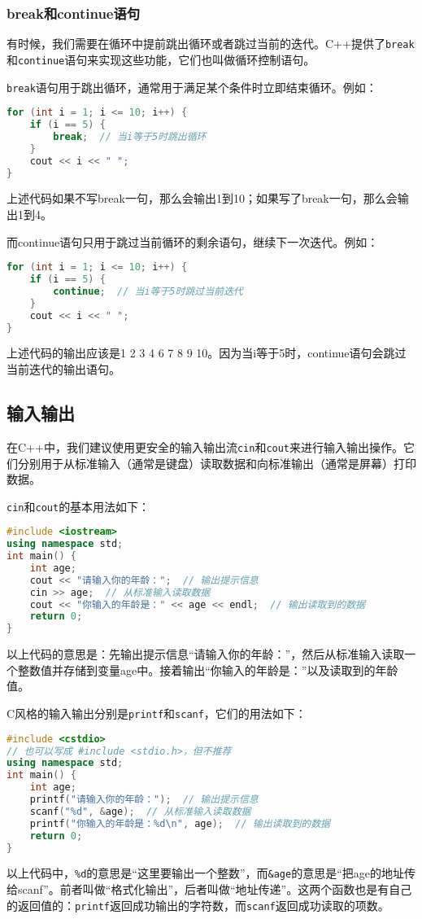 \documentclass[../main.tex]{subfiles}
\begin{document}
\subsubsection{break和continue语句}

有时候，我们需要在循环中提前跳出循环或者跳过当前的迭代。C++提供了\texttt{break}和\texttt{continue}语句来实现这些功能，它们也叫做循环控制语句。

\texttt{break}语句用于跳出循环，通常用于满足某个条件时立即结束循环。例如：
\begin{lstlisting}[language=C++]
for (int i = 1; i <= 10; i++) {
    if (i == 5) {
        break;  // 当i等于5时跳出循环
    }
    cout << i << " ";
}
\end{lstlisting}
上述代码如果不写break一句，那么会输出1到10；如果写了break一句，那么会输出1到4。

而continue语句只用于跳过当前循环的剩余语句，继续下一次迭代。例如：
\begin{lstlisting}[language=C++]
for (int i = 1; i <= 10; i++) {
    if (i == 5) {
        continue;  // 当i等于5时跳过当前迭代
    }
    cout << i << " ";
}
\end{lstlisting}
上述代码的输出应该是1 2 3 4 6 7 8 9 10。因为当i等于5时，continue语句会跳过当前迭代的输出语句。

\subsection{输入输出}

在C++中，我们建议使用更安全的输入输出流\texttt{cin}和\texttt{cout}来进行输入输出操作。它们分别用于从标准输入（通常是键盘）读取数据和向标准输出（通常是屏幕）打印数据。

\texttt{cin}和\texttt{cout}的基本用法如下：
\begin{lstlisting}[language=C++]
#include <iostream>
using namespace std;
int main() {
    int age;
    cout << "请输入你的年龄：";  // 输出提示信息
    cin >> age;  // 从标准输入读取数据
    cout << "你输入的年龄是：" << age << endl;  // 输出读取到的数据
    return 0;
}
\end{lstlisting}
以上代码的意思是：先输出提示信息“请输入你的年龄：”，然后从标准输入读取一个整数值并存储到变量age中。接着输出“你输入的年龄是：”以及读取到的年龄值。

C风格的输入输出分别是\texttt{printf}和\texttt{scanf}，它们的用法如下：
\begin{lstlisting}[language=C++]
#include <cstdio>
// 也可以写成 #include <stdio.h>，但不推荐
using namespace std;
int main() {
    int age;
    printf("请输入你的年龄：");  // 输出提示信息
    scanf("%d", &age);  // 从标准输入读取数据
    printf("你输入的年龄是：%d\n", age);  // 输出读取到的数据
    return 0;
}
\end{lstlisting}
以上代码中，\texttt{\%d}的意思是“这里要输出一个整数”，而\texttt{\&age}的意思是“把age的地址传给scanf”。前者叫做“格式化输出”，后者叫做“地址传递”。这两个函数也是有自己的返回值的：\texttt{printf}返回成功输出的字符数，而\texttt{scanf}返回成功读取的项数。
\end{document}
